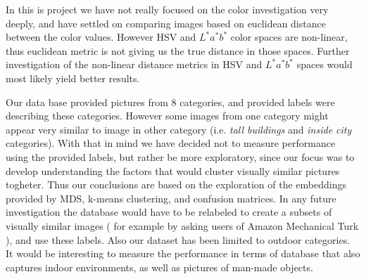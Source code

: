 \documentclass{report}
\begin{document}
In this is project we have not really focused on the color investigation very deeply, and have settled on comparing images based on euclidean distance between the  color values. However HSV and $L^*a^*b^*$ color spaces are non-linear, thus euclidean metric is not giving us the true distance in those spaces. Further investigation of the non-linear distance metrics in HSV and $L^*a^*b^*$ spaces would most likely yield better results.

Our data base provided pictures from 8 categories, and provided labels were describing these categories. However some images from one category might appear very similar to image in other category (i.e. \textit{tall buildings} and \textit{inside city} categories). With that in mind we have decided not to measure performance using the provided labels, but rather be more exploratory, since our focus was to develop understanding the factors that would cluster visually similar pictures togheter. Thus our conclusions are based on the exploration of the embeddings provided by MDS, k-means clustering, and confusion matrices. In any future investigation the database would have to be relabeled to create a subsets of visually similar images ( for example by asking users of Amazon Mechanical Turk ), and use these labels. Also our dataset has been limited to outdoor categories. It would be interesting to measure the performance in terms of database that also captures indoor environments, as well as pictures of man-made objects.
\end{document}
